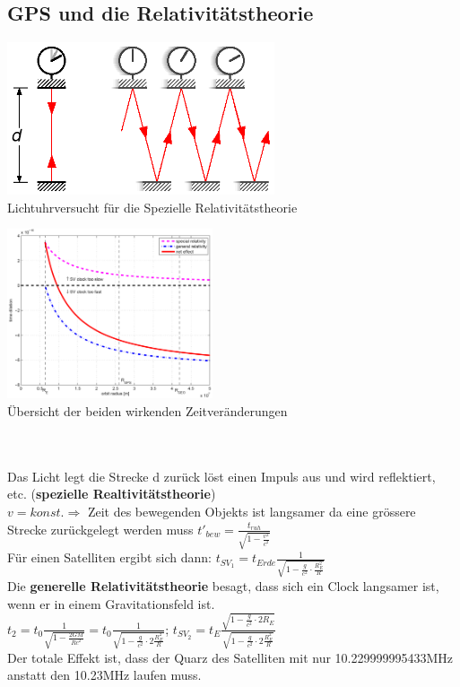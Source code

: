\subsection{GPS und die Relativitätstheorie}
	\begin{minipage}{10cm}
    	\includegraphics[height=4.5cm]{./bilder/GPS-Relativitaettheory.png}\\
    	Lichtuhrversucht für die Spezielle Relativitätstheorie
    \end{minipage}
	\begin{minipage}{8cm}
		\includegraphics[height=5cm]{./bilder/GPS-ZeitKorrektur.png}\\
		Übersicht der beiden wirkenden Zeitveränderungen
	\end{minipage}\\ \\
	Das Licht legt die Strecke d zurück löst einen Impuls aus und wird
	reflektiert, etc. (\textbf{spezielle Realtivitätstheorie}) \\
	$v=konst.\Rightarrow$ Zeit des bewegenden Objekts ist langsamer da eine
	grössere Strecke zurückgelegt werden muss 
	$ t'_{bew} = \frac{t_{ruh}}{\sqrt{1 - \frac{v^2}{c^2}}}$\\
	Für einen Satelliten ergibt sich dann:
	$t_{SV_1}= t_{Erde} \frac 1{\sqrt{1-\frac{g}{c^2}\cdot \frac{R_E^2}R}}$\\
	Die \textbf{generelle Relativitätstheorie} besagt, dass sich ein Clock
	langsamer ist, wenn er in einem Gravitationsfeld ist.\\
	$t_2 = t_0 \frac 1{\sqrt{1-\frac{2GM}{Rc^2}}} 
  	= t_0 \frac 1{\sqrt{1-\frac{g}{c^2}\cdot 2\frac{R_E^2}R}}$; 
  	$t_{SV_2}= t_E \frac{\sqrt{1-\frac{g}{c^2}\cdot 2 R_E }}
    {\sqrt{1-\frac{g}{c^2}\cdot 2\frac{R_E^2}R }}$\\
    Der totale Effekt ist, dass der Quarz des Satelliten mit nur
    10.229999995433MHz anstatt den 10.23MHz laufen muss.
    
